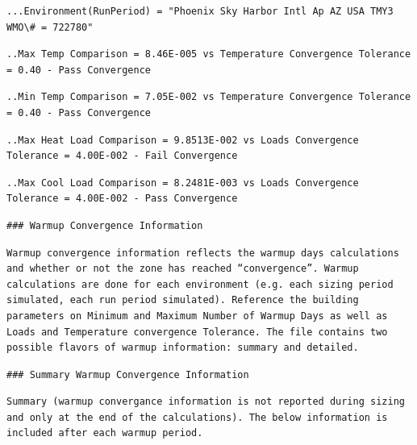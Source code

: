 \begin{lstlisting}
...Environment(RunPeriod) = "Phoenix Sky Harbor Intl Ap AZ USA TMY3 WMO\# = 722780"
\end{lstlisting}

\begin{lstlisting}
..Max Temp Comparison = 8.46E-005 vs Temperature Convergence Tolerance = 0.40 - Pass Convergence
\end{lstlisting}

\begin{lstlisting}
..Min Temp Comparison = 7.05E-002 vs Temperature Convergence Tolerance = 0.40 - Pass Convergence
\end{lstlisting}

\begin{lstlisting}
..Max Heat Load Comparison = 9.8513E-002 vs Loads Convergence Tolerance = 4.00E-002 - Fail Convergence
\end{lstlisting}

\begin{lstlisting}
..Max Cool Load Comparison = 8.2481E-003 vs Loads Convergence Tolerance = 4.00E-002 - Pass Convergence
\end{lstlisting}

\begin{lstlisting}
### Warmup Convergence Information
\end{lstlisting}

\begin{lstlisting}
Warmup convergence information reflects the warmup days calculations and whether or not the zone has reached “convergence”. Warmup calculations are done for each environment (e.g. each sizing period simulated, each run period simulated). Reference the building parameters on Minimum and Maximum Number of Warmup Days as well as Loads and Temperature convergence Tolerance. The file contains two possible flavors of warmup information: summary and detailed.
\end{lstlisting}

\begin{lstlisting}
### Summary Warmup Convergence Information
\end{lstlisting}

\begin{lstlisting}
Summary (warmup convergance information is not reported during sizing and only at the end of the calculations). The below information is included after each warmup period.
\end{lstlisting}

